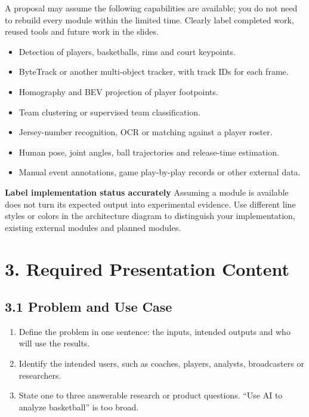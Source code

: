 \documentclass[11pt,a4paper]{article}
\begin{document}
A proposal may assume the following capabilities are available; you do not need to rebuild every module within the limited time. Clearly label completed work, reused tools and future work in the slides.

\begin{itemize}[leftmargin=1.6em,itemsep=3pt]
  \item Detection of players, basketballs, rims and court keypoints.
  \item ByteTrack or another multi-object tracker, with track IDs for each frame.
  \item Homography and BEV projection of player footpoints.
  \item Team clustering or supervised team classification.
  \item Jersey-number recognition, OCR or matching against a player roster.
  \item Human pose, joint angles, ball trajectories and release-time estimation.
  \item Manual event annotations, game play-by-play records or other external data.
\end{itemize}

\begin{tcolorbox}[colback=Accent,colframe=Rule,arc=1mm,boxrule=0.45pt]
\textbf{Label implementation status accurately}\quad
Assuming a module is available does not turn its expected output into experimental evidence. Use different line styles or colors in the architecture diagram to distinguish your implementation, existing external modules and planned modules.
\end{tcolorbox}

\section{3. Required Presentation Content}

\subsection{3.1 Problem and Use Case}

\begin{enumerate}[leftmargin=1.8em,label=\arabic*.,itemsep=3pt]
  \item Define the problem in one sentence: the inputs, intended outputs and who will use the results.
  \item Identify the intended users, such as coaches, players, analysts, broadcasters or researchers.
  \item State one to three answerable research or product questions. ``Use AI to analyze basketball'' is too broad.
\end{enumerate}
\end{document}
